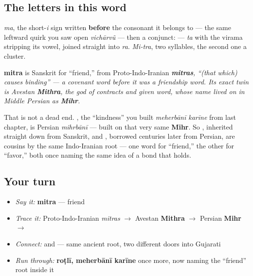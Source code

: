 \subsection*{The letters in this word}
\textbf{} \emph{ma}, \textbf{} the short-\emph{i} sign written \textbf{before} the consonant it belongs to — the same leftward quirk you saw open \emph{vichārvũ} — then a conjunct: \textbf{} — \textbf{} \emph{ta} with the virama \textbf{} stripping its vowel, joined straight into \textbf{} \emph{ra}. \emph{Mi-tra}, two syllables, the second one a cluster.

\begin{cousinweb}
\textbf{mitra} is Sanskrit for \textquotedblleft{}friend,\textquotedblright{} from Proto-Indo-Iranian \emph{\textbf{mitras}, \textquotedblleft{}(that which) causes binding\textquotedblright{} — a covenant word before it was a friendship word. Its exact twin is Avestan \textbf{Mithra}, the god of contracts and given word, whose name lived on in Middle Persian as \textbf{Mihr}.}

That is not a dead end. \textbf{}, the \textquotedblleft{}kindness\textquotedblright{} you built \emph{meherbānī karīne} from last chapter, is Persian \emph{mihrbānī} — built on that very same \textbf{Mihr}. So \textbf{}, inherited straight down from Sanskrit, and \textbf{}, borrowed centuries later from Persian, are cousins by the same Indo-Iranian root — one word for \textquotedblleft{}friend,\textquotedblright{} the other for \textquotedblleft{}favor,\textquotedblright{} both once naming the same idea of a bond that holds.
\end{cousinweb}

\subsection*{Your turn}
\begin{itemize}
\raggedright
  \item \emph{Say it:} \textbf{mitra} — friend
  \item \emph{Trace it:} Proto-Indo-Iranian \emph{mitras} $\to$ Avestan \textbf{Mithra} $\to$ Persian \textbf{Mihr} $\to$ \textbf{}
  \item \emph{Connect:} \textbf{} and \textbf{} — same ancient root, two different doors into Gujarati
  \item \emph{Run through:} \textbf{roṭlī, meherbānī karīne} once more, now naming the \textquotedblleft{}friend\textquotedblright{} root inside it
\end{itemize}

